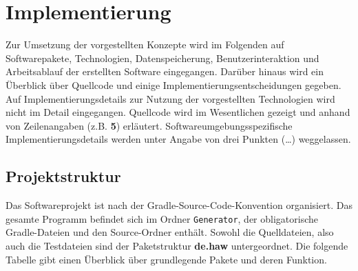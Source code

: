 
\chapter{Implementierung}
Zur Umsetzung der vorgestellten Konzepte wird im Folgenden auf Softwarepakete, Technologien, Datenspeicherung,
Benutzerinteraktion und Arbeitsablauf der erstellten Software eingegangen.
Darüber hinaus wird ein Überblick über Quellcode und einige Implementierungsentscheidungen gegeben.
Auf Implementierungsdetails zur Nutzung der vorgestellten Technologien wird nicht im Detail eingegangen.
Quellcode wird im Wesentlichen gezeigt und anhand von Zeilenangaben (z.B. \textbf{5}) erläutert.
Softwareumgebungsspezifische Implementierungsdetails werden unter Angabe von drei Punkten (\ldots) weggelassen.

\section{Projektstruktur}
Das Softwareprojekt ist nach der Gradle-Source-Code-Konvention organisiert.
Das gesamte Programm befindet sich im Ordner \texttt{Generator}, der obligatorische Gradle-Dateien und den
Source-Ordner enthält.
Sowohl die Quelldateien, also auch die Testdateien sind der Paketstruktur \textbf{de.haw} untergeordnet.
Die folgende Tabelle gibt einen Überblick über grundlegende Pakete und deren Funktion.

